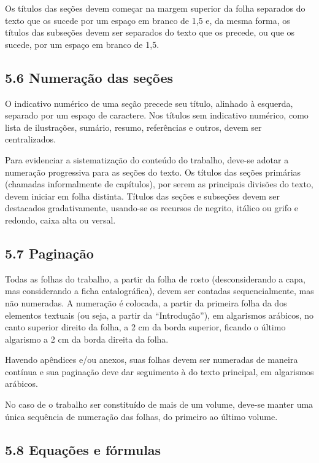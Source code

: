 \documentclass[
	12pt,				%
	oneside,			%
	a4paper,			%
	english,			%
	brazil				%
	]{abntex2ppgsi}
\begin{document}
\begin{anexosenv}
Os títulos das seções devem começar na margem superior da folha separados do texto que os sucede por um espaço em branco de 1,5 e, da mesma forma, os títulos das subseções devem ser separados do texto que os precede, ou que os sucede, por um espaço em branco de 1,5.

\subsection*{5.6 Numeração das seções}

O indicativo numérico de uma seção precede seu título, alinhado à esquerda, separado por um espaço de caractere. Nos títulos sem indicativo numérico, como lista de ilustrações, sumário, resumo, referências e outros, devem ser centralizados.

Para evidenciar a sistematização do conteúdo do trabalho, deve-se adotar a numeração progressiva para as seções do texto. Os títulos das seções primárias (chamadas informalmente de capítulos), por serem as principais divisões do texto, devem iniciar em folha distinta. Títulos das seções e subseções devem ser destacados gradativamente, usando-se os recursos de negrito, itálico ou grifo e redondo, caixa alta ou versal.

\subsection*{5.7 Paginação}

Todas as folhas do trabalho, a partir da folha de rosto (desconsiderando a capa, mas considerando a ficha catalográfica), devem ser contadas sequencialmente, mas não numeradas. A numeração é colocada, a partir da primeira folha da dos elementos textuais (ou seja, a partir da ``Introdução''), em algarismos arábicos, no canto superior direito da folha, a 2 cm da borda superior, ficando o último algarismo a 2 cm da borda direita da folha.

Havendo apêndices e/ou anexos, suas folhas devem ser numeradas de maneira contínua e sua paginação deve dar seguimento à do texto principal, em algarismos arábicos.

No caso de o trabalho ser constituído de mais de um volume, deve-se manter uma única sequência de numeração das folhas, do primeiro ao último volume.

\subsection*{5.8 Equações e fórmulas}


\end{anexosenv}
\end{document}
